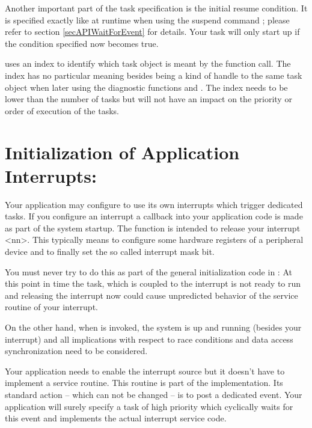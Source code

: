 Another important part of the task specification is the initial resume
condition. It is specified exactly like at runtime when using the suspend
command ; please refer to section
\ref{secAPIWaitForEvent} for details. Your task will only start up if the
condition specified now becomes true.

 uses an index to identify which task object is
meant by the function call. The index has no particular meaning besides
being a kind of handle to the same task object when later using the
diagnostic functions  and
. The index needs to be lower than the number
of tasks but will not have an impact on the priority or order of execution
of the tasks.


\section{Initialization of Application Interrupts:
}

Your application may configure \rtos{} to use its own interrupts which
trigger dedicated tasks. If you configure an interrupt a callback into
your application code is made as part of the system startup. The function
 is intended to
release your interrupt \textless nn\textgreater. This
typically means to configure some hardware registers of a peripheral
device and to finally set the so called interrupt mask bit.

You must never try to do this as part of the general initialization code
in : At this point in time the task, which is coupled to the
interrupt is not ready to run and releasing the interrupt now could cause
unpredicted behavior of the service routine of your interrupt.

On the other hand, when  is invoked, the \rtos{} system is up and running (besides
your interrupt) and all implications with respect to race conditions and
data access synchronization need to be considered.

Your application needs to enable the interrupt source but it doesn't have
to implement a service routine. This routine is part of the \rtos{}
implementation. Its standard action -- which can not be changed -- is to
post a dedicated event. Your application will surely specify a task of
high priority which cyclically waits for this event and implements the
actual interrupt service code.


